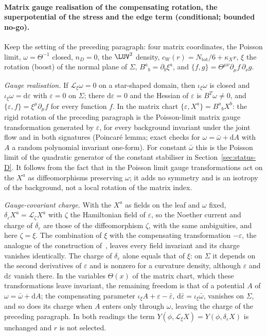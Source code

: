 \paragraph{Matrix gauge realisation of the compensating rotation, the superpotential of the stress and the edge term (conditional; bounded no-go).}
Keep the setting of the preceding paragraph: four matrix coordinates, the Poisson limit, \(\omega=\Theta^{-1}\) closed, \(n_D=0\), the \(\LUV^2\) density, \(c_W(r)=N_{\mathrm{tot}}/6+\kappa_Xr\), \(\xi\) the rotation (boost) of the normal plane of \(\Sigma\), \(B^a{}_b=\partial_b\xi^a\), and \(\{f,g\}=\Theta^{\mu\nu}\partial_\mu f\,\partial_\nu g\).

\emph{Gauge realisation.} If \(\mathcal L_\xi\omega=0\) on a star-shaped domain, then \(\iota_\xi\omega\) is closed and \(\iota_\xi\omega=\mathrm d\varepsilon\) with \(\varepsilon=0\) on \(\Sigma\); there \(\mathrm d\varepsilon=0\) and the Hessian of \(\varepsilon\) is \(B^{T}\omega\neq0\), and \(\{\varepsilon,f\}=\xi^\mu\partial_\mu f\) for every function \(f\). In the matrix chart \(\{\varepsilon,X^a\}=B^a{}_bX^b\): the rigid rotation of the preceding paragraph is the Poisson-limit matrix gauge transformation generated by \(\varepsilon\), for every background invariant under the joint flow and in both signatures (Poincar\'e lemma; exact checks for \(\omega=\bar\omega+\mathrm dA\) with \(A\) a random polynomial invariant one-form). For constant \(\bar\omega\) this is the Poisson limit of the quadratic generator of the constant stabiliser in Section~\ref{sec:status-D}. It follows from the fact that in the Poisson limit gauge transformations act on the \(X^a\) as diffeomorphisms preserving \(\omega\); it adds no symmetry and is an isotropy of the background, not a local rotation of the matrix index.

\emph{Gauge-covariant charge.} With the \(X^a\) as fields on the leaf and \(\omega\) fixed, \(\delta_\varepsilon X^a=\mathcal L_\zeta X^a\) with \(\zeta\) the Hamiltonian field of \(\varepsilon\), so the Noether current and charge of \(\delta_\varepsilon\) are those of the diffeomorphism \(\zeta\), with the same ambiguities, and here \(\zeta=\xi\). The combination of \(\xi\) with the compensating transformation \(-\varepsilon\), the analogue of the construction of~\cite{JacobsonMohd2015}, leaves every field invariant and its charge vanishes identically. The charge of \(\delta_\varepsilon\) alone equals that of \(\xi\): on \(\Sigma\) it depends on the second derivatives of \(\varepsilon\) and is nonzero for a curvature density, although \(\varepsilon\) and \(\mathrm d\varepsilon\) vanish there. In the variables \(\Theta(x)\) of the matrix chart, which these transformations leave invariant, the remaining freedom is that of a potential \(A\) of \(\omega=\bar\omega+\mathrm dA\); the compensating parameter \(\iota_\xi A+\varepsilon-\bar\varepsilon\), \(\mathrm d\bar\varepsilon=\iota_\xi\bar\omega\), vanishes on \(\Sigma\), and so does its charge when \(A\) enters only through \(\omega\), leaving the charge of the preceding paragraph. In both readings the term \(Y(\phi,\mathcal L_\xi X)=Y(\phi,\delta_\varepsilon X)\) is unchanged and \(r\) is not selected.

